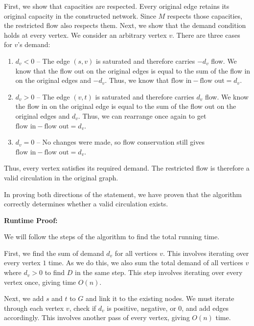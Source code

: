 \documentclass[11pt]{article}
\begin{document}
\begin{enumerate}
First, we show that capacities are respected. Every original edge retains its original capacity in the constructed network. 
Since $M$ respects those capacities, the restricted flow also respects them. Next, we show that the demand condition holds at every vertex. 
We consider an arbitrary vertex $v$. There are three cases for $v$'s demand:

\begin{enumerate}[label=(\arabic*), noitemsep]
    \item $d_v < 0$ -- The edge $(s, v)$ is saturated and therefore carries $-d_v$ flow. We know that the flow out on the original edges is equal to 
    the sum of the flow in on the original edges and $-d_v$. Thus, we know that $\text{flow in} - \text{flow out} = d_v$. 
    \item $d_v > 0$ -- The edge $(v, t)$ is saturated and therefore carries $d_v$ flow. We know the flow in on the original edge is equal to 
    the sum of the flow out on the original edges and $d_v$. Thus, we can rearrange once again to get $\text{flow in} - \text{flow out} = d_v$. 
    \item $d_v = 0$ -- No changes were made, so flow conservation still gives $\text{flow in} - \text{flow out} = d_v$.
\end{enumerate}

Thus, every vertex satisfies its required demand. The restricted flow is therefore a valid circulation in the original graph.

\medbreak

In proving both directions of the statement, we have proven that the algorithm correctly determines whether a valid circulation exists.

\bigbreak

\textbf{Runtime Proof:}

We will follow the steps of the algorithm to find the total running time. 

First, we find the sum of demand $d_v$ for all vertices $v$. This involves iterating over every vertex $1$ time. 
As we do this, we also sum the total demand of all vertices $v$ where $d_v > 0$ to find $D$ in the same step. 
This step involves iterating over every vertex once, giving time $O(n)$. 

Next, we add $s$ and $t$ to $G$ and link it to the existing nodes. We must iterate through each vertex $v$, check if $d_v$ is positive, negative, or $0$, 
and add edges accordingly. This involves another pass of every vertex, giving $O(n)$ time. 


\end{enumerate}
\end{document}
